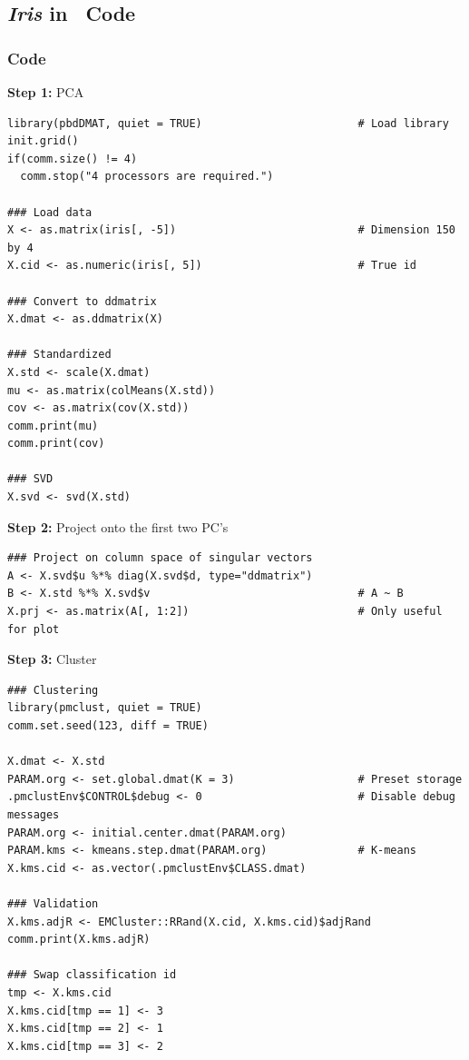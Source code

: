 \subsection{{\it Iris} in \ Code}

\subsubsection{Code}



\textbf{Step 1:}  PCA\vspace{-.6cm}
\begin{lstlisting}[language=rr]
library(pbdDMAT, quiet = TRUE)                        # Load library
init.grid()
if(comm.size() != 4)
  comm.stop("4 processors are required.")

### Load data
X <- as.matrix(iris[, -5])                            # Dimension 150 by 4
X.cid <- as.numeric(iris[, 5])                        # True id

### Convert to ddmatrix
X.dmat <- as.ddmatrix(X)

### Standardized
X.std <- scale(X.dmat)
mu <- as.matrix(colMeans(X.std))
cov <- as.matrix(cov(X.std))
comm.print(mu)
comm.print(cov)

### SVD
X.svd <- svd(X.std)                  
\end{lstlisting}

\textbf{Step 2:}  Project onto the first two PC's\vspace{-.6cm}
\begin{lstlisting}[language=rr]
### Project on column space of singular vectors
A <- X.svd$u %*% diag(X.svd$d, type="ddmatrix")
B <- X.std %*% X.svd$v                                # A ~ B
X.prj <- as.matrix(A[, 1:2])                          # Only useful for plot
\end{lstlisting}

\textbf{Step 3:}  Cluster\vspace{-.6cm}
\begin{lstlisting}[language=rr]
### Clustering
library(pmclust, quiet = TRUE)
comm.set.seed(123, diff = TRUE)

X.dmat <- X.std
PARAM.org <- set.global.dmat(K = 3)                   # Preset storage
.pmclustEnv$CONTROL$debug <- 0                        # Disable debug messages
PARAM.org <- initial.center.dmat(PARAM.org)
PARAM.kms <- kmeans.step.dmat(PARAM.org)              # K-means
X.kms.cid <- as.vector(.pmclustEnv$CLASS.dmat)

### Validation
X.kms.adjR <- EMCluster::RRand(X.cid, X.kms.cid)$adjRand
comm.print(X.kms.adjR)

### Swap classification id
tmp <- X.kms.cid
X.kms.cid[tmp == 1] <- 3
X.kms.cid[tmp == 2] <- 1
X.kms.cid[tmp == 3] <- 2
\end{lstlisting}

